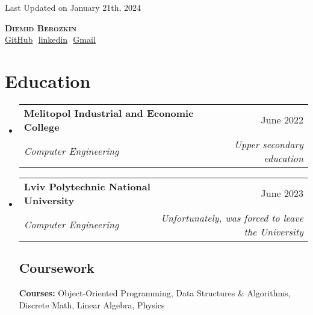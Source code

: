 \documentclass[letterpaper,11pt]{article}
\makeatletter
\newcommand{\resumeSubheading}[4]{
  \vspace{-2pt}\item
    \begin{tabular*}{0.97\textwidth}[t]{l@{\extracolsep{\fill}}r}
      \textbf{#1} & #2 \\
      \textit{\small#3} & \textit{\small #4} \\
    \end{tabular*}\vspace{-7pt}
}
\newcommand{\resumeSubHeadingListStart}{\begin{itemize}[leftmargin=0.15in, label={}]}
\newcommand{\resumeSubHeadingListEnd}{\end{itemize}}
\makeatother
\begin{document}
\begin{flushright}
  \color{gray}
  \item
  Last Updated on January 21th, 2024
\end{flushright}

\vspace{-5pt}

\begin{center}
    \textbf{\Huge \scshape Diemid Berozkin} \\ \vspace{8pt}
    \small 
    \href{https://github.com/mattyDoe}{\underline{GitHub}} $  $
    \href{https://www.linkedin.com/in/diemid-berozkin-665118250/}{\underline{linkedin}} $  $
    \href{https://mail.google.com/mail/u/0/#inbox}
    {\underline{Gmail}}
\end{center}

\section{Education}
  \resumeSubHeadingListStart
  
    \resumeSubheading
      {Melitopol Industrial and Economic College}{June 2022}
      {Computer Engineering}
      {Upper secondary education}
      
    \resumeSubheading
      {Lviv Polytechnic National University} {June 2023}
      {Computer Engineering}
      {Unfortunately, was forced to leave the University}

    \vspace{-10pt}

    \subsection{Coursework}
      \textbf{Courses:} Object-Oriented Programming, Data Structures \& Algorithms, Discrete Math, Linear Algebra, Physics \\
      
  \resumeSubHeadingListEnd

\end{document}
